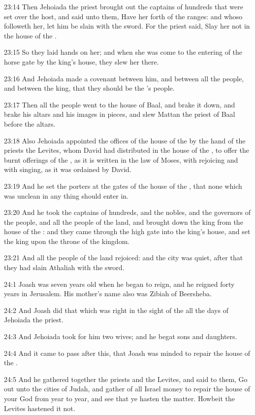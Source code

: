 23:14 Then Jehoiada the priest brought out the captains of hundreds that were set over the host, and said unto them, Have her forth of the ranges: and whoso followeth her, let him be slain with the sword. For the priest said, Slay her not in the house of the \LORD.

23:15 So they laid hands on her; and when she was come to the entering of the horse gate by the king's house, they slew her there.

23:16 And Jehoiada made a covenant between him, and between all the people, and between the king, that they should be the \LORD's people.

23:17 Then all the people went to the house of Baal, and brake it down, and brake his altars and his images in pieces, and slew Mattan the priest of Baal before the altars.

23:18 Also Jehoiada appointed the offices of the house of the \LORD by the hand of the priests the Levites, whom David had distributed in the house of the \LORD, to offer the burnt offerings of the \LORD, as it is written in the law of Moses, with rejoicing and with singing, as it was ordained by David.

23:19 And he set the porters at the gates of the house of the \LORD, that none which was unclean in any thing should enter in.

23:20 And he took the captains of hundreds, and the nobles, and the governors of the people, and all the people of the land, and brought down the king from the house of the \LORD: and they came through the high gate into the king's house, and set the king upon the throne of the kingdom.

23:21 And all the people of the land rejoiced: and the city was quiet, after that they had slain Athaliah with the sword.

24:1 Joash was seven years old when he began to reign, and he reigned forty years in Jerusalem. His mother's name also was Zibiah of Beersheba.

24:2 And Joash did that which was right in the sight of the \LORD all the days of Jehoiada the priest.

24:3 And Jehoiada took for him two wives; and he begat sons and daughters.

24:4 And it came to pass after this, that Joash was minded to repair the house of the \LORD.

24:5 And he gathered together the priests and the Levites, and said to them, Go out unto the cities of Judah, and gather of all Israel money to repair the house of your God from year to year, and see that ye hasten the matter. Howbeit the Levites hastened it not.

